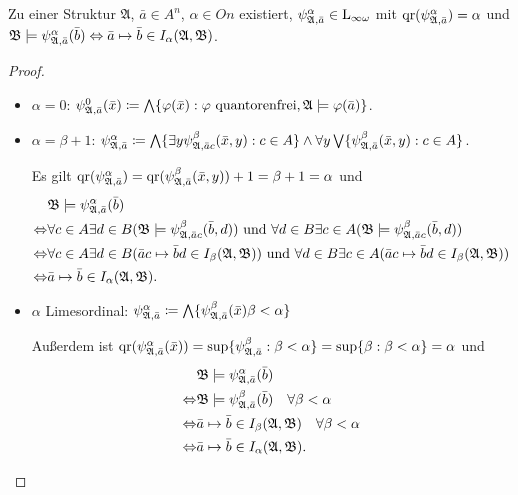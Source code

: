 \begin{satz}
	Zu einer Struktur $\mathfrak{A}$, $\bar{a}\in A^n$, $\alpha\in On$ existiert, $\psi^\alpha_{\mathfrak{A},\bar{a}}\in \operatorname{L}_{\infty\omega}$ mit $\operatorname{qr}(\psi^\alpha_{\mathfrak{A},\bar{a}})=\alpha$ und $\mathfrak{B}\models \psi^\alpha_{\mathfrak{A},\bar{a}}(\bar{b}) \Leftrightarrow \bar{a}\mapsto\bar{b}\in I_\alpha(\mathfrak{A},\mathfrak{B})$.
\end{satz}
\begin{proof}
	\begin{itemize}
		\item $\alpha=0$:
		 $\psi^0_{\mathfrak{A},\bar{a}}(\bar{x})\coloneqq\bigwedge\{\varphi(\bar{x}) : \varphi \text{ quantorenfrei}, \mathfrak{A}\models\varphi(\bar{a})\}$.
		
		\item $\alpha=\beta+1$:
		$\psi^\alpha_{\mathfrak{A},\bar{a}}\coloneqq \bigwedge\{\exists y \psi^\beta_{\mathfrak{A},\bar{a}c}(\bar{x},y) : c\in A\} \land \forall y \bigvee \{\psi^\beta_{\mathfrak{A},\bar{a}}(\bar{x},y) : c\in A\}$.
		
		Es gilt $\operatorname{qr}(\psi^\alpha_{\mathfrak{A},\bar{a}})=\operatorname{qr}(\psi^\beta_{\mathfrak{A},\bar{a}}(\bar{x},y))+1 = \beta+1 =\alpha$ und 
		\begin{align*}
			&\mathfrak{B}\models \psi^\alpha_{\mathfrak{A},\bar{a}}(\bar{b}) \\
			\Leftrightarrow & \forall c \in A \exists d\in B (\mathfrak{B}\models \psi^\beta_{\mathfrak{A},\bar{a}c}(\bar{b},d)) \text{ und }
				\forall d\in B \exists c\in A(\mathfrak{B}\models \psi^\beta_{\mathfrak{A},\bar{a}c}(\bar{b},d)) \\
			\Leftrightarrow & \forall c \in A \exists d\in B (\bar{a}c\mapsto \bar{b}d\in I_\beta(\mathfrak{A},\mathfrak{B})) \text{ und }
			\forall d\in B \exists c\in A(\bar{a}c\mapsto \bar{b}d\in I_\beta(\mathfrak{A},\mathfrak{B})) \\
			\Leftrightarrow & \bar{a}\mapsto\bar{b} \in I_\alpha(\mathfrak{A},\mathfrak{B}).
		\end{align*}
		
		\item $\alpha$ Limesordinal: $\psi^\alpha_{\mathfrak{A},\bar{a}}\coloneqq \bigwedge\{\psi^\beta_{\mathfrak{A},\bar{a}}(\bar{x})  \beta < \alpha\}$
		
		Außerdem ist $\operatorname{qr}(\psi^\alpha_{\mathfrak{A},\bar{a}}(\bar{x}))=\sup\{\psi^\beta_{\mathfrak{A},\bar{a}}:\beta < \alpha\} = \sup\{\beta : \beta < \alpha\} = \alpha$ und
		\begin{align*}
			& \mathfrak{B}\models \psi^\alpha_{\mathfrak{A},\bar{a}}(\bar{b}) \\
			\Leftrightarrow & \mathfrak{B}\models \psi^\beta_{\mathfrak{A},\bar{a}}(\bar{b}) \quad \forall \beta < \alpha \\
			\Leftrightarrow & \bar{a}\mapsto\bar{b} \in I_\beta(\mathfrak{A},\mathfrak{B}) \quad \forall \beta <\alpha \\
			\Leftrightarrow & \bar{a}\mapsto \bar{b} \in I_\alpha(\mathfrak{A},\mathfrak{B}).
		\end{align*}
	\end{itemize}
\end{proof}

